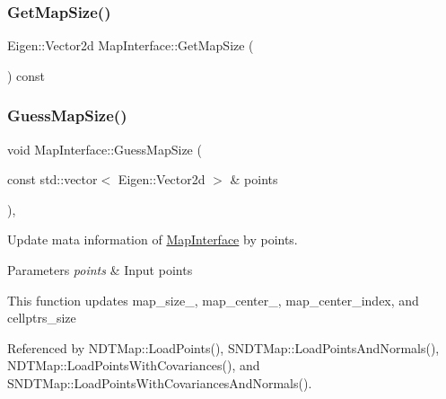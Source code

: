 \mbox{\label{classMapInterface_acfbb86571ebd3fd0404eb238f5a4d52c}} 
\subsubsection{\texorpdfstring{Get\+Map\+Size()}{GetMapSize()}}
{\footnotesize\ttfamily Eigen\+::\+Vector2d Map\+Interface\+::\+Get\+Map\+Size (\begin{DoxyParamCaption}{ }\end{DoxyParamCaption}) const\hspace{0.3cm}{\ttfamily [inline]}}

\mbox{\label{classMapInterface_a37aaa1fd2a400cb1138100eeae9b566b}} 
\subsubsection{\texorpdfstring{Guess\+Map\+Size()}{GuessMapSize()}}
{\footnotesize\ttfamily void Map\+Interface\+::\+Guess\+Map\+Size (\begin{DoxyParamCaption}\item[{const std\+::vector$<$ Eigen\+::\+Vector2d $>$ \&}]{points }\end{DoxyParamCaption})\hspace{0.3cm}{\ttfamily [inline]}, {\ttfamily [protected]}}



Update mata information of \hyperlink{classMapInterface}{Map\+Interface} by points. 


\begin{DoxyParams}{Parameters}
{\em points} & Input points\\
\hline
\end{DoxyParams}
This function updates {\ttfamily map\+\_\+size\+\_\+}, {\ttfamily map\+\_\+center\+\_\+}, {\ttfamily map\+\_\+center\+\_\+index}, and {\ttfamily cellptrs\+\_\+size} 

Referenced by N\+D\+T\+Map\+::\+Load\+Points(), S\+N\+D\+T\+Map\+::\+Load\+Points\+And\+Normals(), N\+D\+T\+Map\+::\+Load\+Points\+With\+Covariances(), and S\+N\+D\+T\+Map\+::\+Load\+Points\+With\+Covariances\+And\+Normals().

